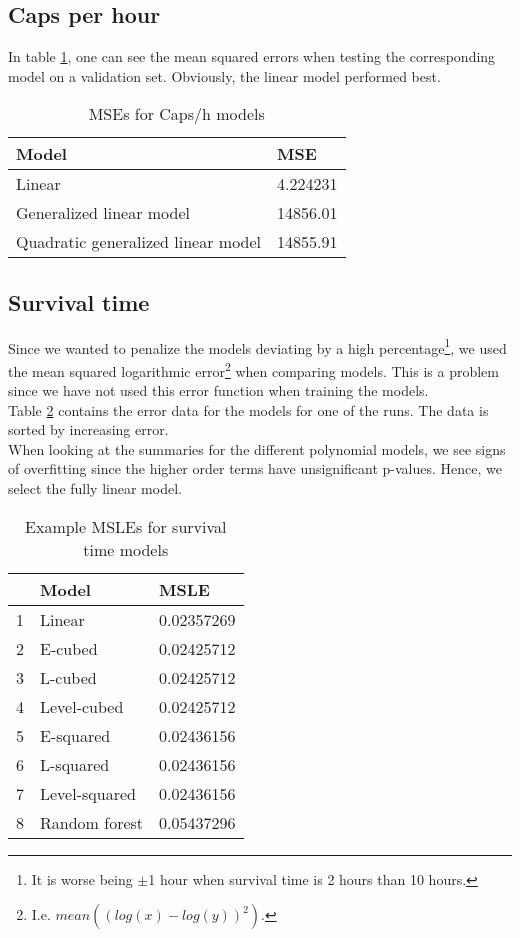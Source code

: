 \subsection{Caps per hour}
In table \ref{table:MSE.caps}, one can see the mean squared errors when testing the corresponding model on a validation set. Obviously, the linear model performed best.
\begin{table}
\caption{MSEs for Caps/h models}
\label{table:MSE.caps}
\centering
\begin{tabular}{l|l}
\hline
\textbf{Model}&\textbf{MSE}\\
\hline
Linear&4.224231\\
Generalized linear model&14856.01\\
Quadratic generalized linear model&14855.91\\
\hline
\end{tabular}
\end{table}


\subsection{Survival time}
Since we wanted to penalize the models deviating by a high percentage\footnote{It is worse being $\pm$1 hour when survival time is 2 hours than 10 hours.}, we used the mean squared logarithmic error\footnote{I.e. $mean((log(x)-log(y))^2)$.} when comparing models. This is a problem since we have not used this error function when training the models.\\

Table \ref{table:MSLE.survival} contains the error data for the models for one of the runs. The data is sorted by increasing error.\\

When looking at the summaries for the different polynomial models, we see signs of overfitting since the higher order terms have unsignificant p-values. Hence, we select the fully linear model.
\begin{table}
\caption{Example MSLEs for survival time models}
\label{table:MSLE.survival}
\centering
\begin{tabular}{l l|l}
\hline
&\textbf{Model}&\textbf{MSLE}\\
\hline
1 & Linear & 0.02357269 \\
2 & E-cubed & 0.02425712 \\
3 & L-cubed & 0.02425712 \\
4 & Level-cubed & 0.02425712 \\
5 & E-squared & 0.02436156 \\
6 & L-squared & 0.02436156 \\
7 & Level-squared & 0.02436156 \\
8 & Random forest & 0.05437296\\
\hline
\end{tabular}
\end{table}